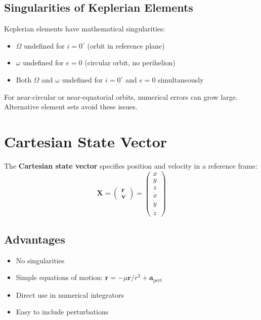 \subsection{Singularities of Keplerian Elements}

Keplerian elements have mathematical singularities:
\begin{itemize}
    \item $\Omega$ undefined for $i = 0^\circ$ (orbit in reference plane)
    \item $\omega$ undefined for $e = 0$ (circular orbit, no perihelion)
    \item Both $\Omega$ and $\omega$ undefined for $i = 0^\circ$ and $e = 0$ simultaneously
\end{itemize}

For near-circular or near-equatorial orbits, numerical errors can grow large. Alternative element sets avoid these issues.

\section{Cartesian State Vector}

The \textbf{Cartesian state vector} specifies position and velocity in a reference frame:
\begin{equation}
    \mathbf{X} = \begin{pmatrix} \mathbf{r} \\ \mathbf{v} \end{pmatrix} = \begin{pmatrix} x \\ y \\ z \\ \dot{x} \\ \dot{y} \\ \dot{z} \end{pmatrix}
\end{equation}

\subsection{Advantages}
\begin{itemize}
    \item No singularities
    \item Simple equations of motion: $\ddot{\mathbf{r}} = -\mu \mathbf{r}/r^3 + \mathbf{a}_{\text{pert}}$
    \item Direct use in numerical integrators
    \item Easy to include perturbations
\end{itemize}


